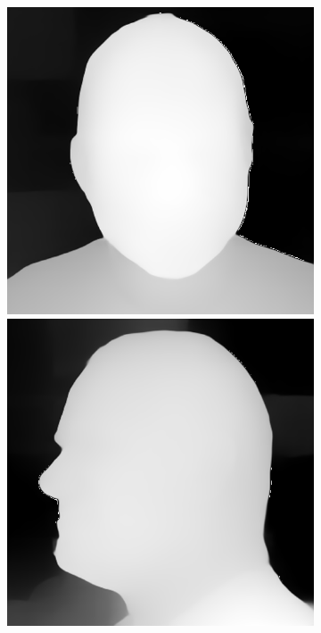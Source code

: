 \begin{figure}[ht]
\begin{subfigure}{0.18\linewidth}
        \includegraphics[width=\textwidth]{Figures/failed/controlnet/depth/0-2-4-2-293_210300_829_depth.png}
        \includegraphics[width=\textwidth]{Figures/failed/controlnet/depth/0-C-5-1-5386_212530_574_depth.png}

\end{subfigure}
\end{figure}
